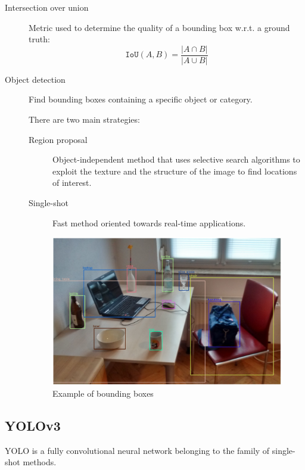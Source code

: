 \begin{description}
    \item[Intersection over union] 
        Metric used to determine the quality of a bounding box w.r.t. a ground truth:
        \[ \texttt{IoU}(A, B) = \frac{\vert A \cap B \vert}{\vert A \cup B \vert} \]

    \item[Object detection] 
        Find bounding boxes containing a specific object or category.

        There are two main strategies:
        \begin{description}
            \item[Region proposal] 
                Object-independent method that uses selective search algorithms to exploit the texture and the structure of the image to find locations of interest.

            \item[Single-shot] 
                Fast method oriented towards real-time applications.
        \end{description}

        \begin{figure}[H]
            \centering
            \includegraphics[width=0.35\linewidth]{./img/object_detection.png}
            \caption{Example of bounding boxes}
        \end{figure}
\end{description}


\subsection{YOLOv3}

YOLO is a fully convolutional neural network belonging to the family of single-shot methods.

